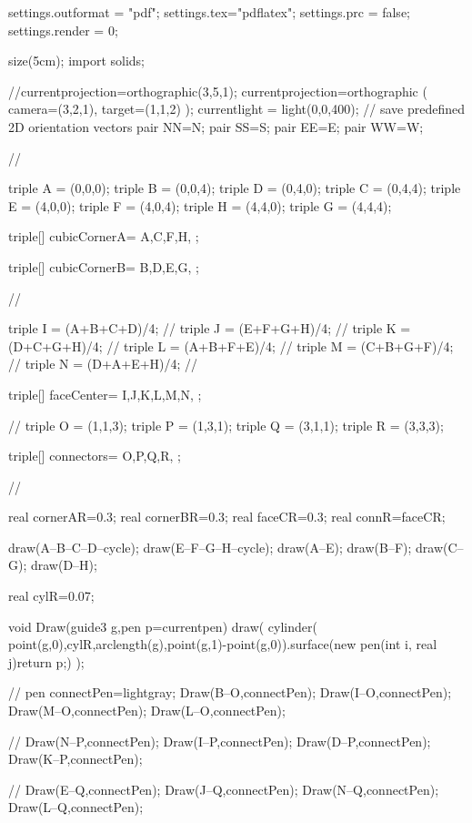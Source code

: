 \documentclass{standalone}
\begin{document}
	\begin{asy}
	settings.outformat = "pdf";
	settings.tex="pdflatex";
	settings.prc = false;
	settings.render = 0;

size(5cm);
import solids;

//currentprojection=orthographic(3,5,1);
currentprojection=orthographic (
camera=(3,2,1),
target=(1,1,2)
);
currentlight = light(0,0,400);
// save predefined 2D orientation vectors
pair NN=N;
pair SS=S;
pair EE=E;
pair WW=W;

//%

triple A = (0,0,0);
triple B = (0,0,4);
triple D = (0,4,0);
triple C = (0,4,4);
triple E = (4,0,0);
triple F = (4,0,4);
triple H = (4,4,0);
triple G = (4,4,4);

triple[] cubicCornerA={  
A,C,F,H,
};

triple[] cubicCornerB={  
B,D,E,G,
};


//%

triple I = (A+B+C+D)/4; //%
triple J = (E+F+G+H)/4; //%
triple K = (D+C+G+H)/4; //%
triple L = (A+B+F+E)/4; //%
triple M = (C+B+G+F)/4; //%
triple N = (D+A+E+H)/4; //%

triple[] faceCenter={  
I,J,K,L,M,N,
};


//%
triple O = (1,1,3);
triple P = (1,3,1);
triple Q = (3,1,1);
triple R = (3,3,3);

triple[] connectors={  
O,P,Q,R,
};

//%

real cornerAR=0.3;
real cornerBR=0.3;
real faceCR=0.3;
real connR=faceCR;

draw(A--B--C--D--cycle);
draw(E--F--G--H--cycle);
draw(A--E);
draw(B--F);
draw(C--G);
draw(D--H);

real cylR=0.07;

void Draw(guide3 g,pen p=currentpen){
draw(
cylinder(
point(g,0),cylR,arclength(g),point(g,1)-point(g,0)).surface(new pen(int i, real j){return p;})
);
}

//%
pen connectPen=lightgray;
Draw(B--O,connectPen);
Draw(I--O,connectPen);
Draw(M--O,connectPen);
Draw(L--O,connectPen);

//%
Draw(N--P,connectPen);
Draw(I--P,connectPen);
Draw(D--P,connectPen);
Draw(K--P,connectPen);

//%
Draw(E--Q,connectPen);
Draw(J--Q,connectPen);
Draw(N--Q,connectPen);
Draw(L--Q,connectPen);


\end{asy}
\end{document}
